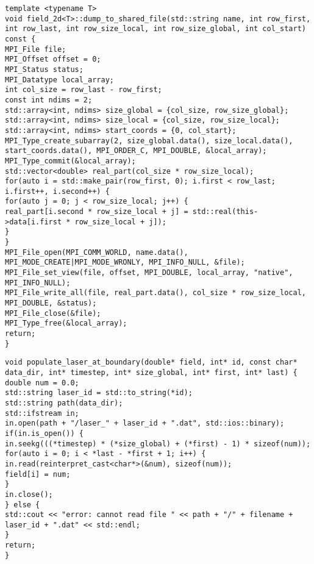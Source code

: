 \begin{lstlisting}[style=CXX, caption=Method for dumping data into shared file]
template <typename T>
void field_2d<T>::dump_to_shared_file(std::string name, int row_first, int row_last, int row_size_local, int row_size_global, int col_start) const {
MPI_File file;
MPI_Offset offset = 0;
MPI_Status status;
MPI_Datatype local_array;
int col_size = row_last - row_first;
const int ndims = 2;
std::array<int, ndims> size_global = {col_size, row_size_global};
std::array<int, ndims> size_local = {col_size, row_size_local};
std::array<int, ndims> start_coords = {0, col_start};
MPI_Type_create_subarray(2, size_global.data(), size_local.data(), start_coords.data(), MPI_ORDER_C, MPI_DOUBLE, &local_array);
MPI_Type_commit(&local_array);
std::vector<double> real_part(col_size * row_size_local);
for(auto i = std::make_pair(row_first, 0); i.first < row_last; i.first++, i.second++) {
for(auto j = 0; j < row_size_local; j++) {
real_part[i.second * row_size_local + j] = std::real(this->data[i.first * row_size_local + j]);
}
}
MPI_File_open(MPI_COMM_WORLD, name.data(), MPI_MODE_CREATE|MPI_MODE_WRONLY, MPI_INFO_NULL, &file);
MPI_File_set_view(file, offset, MPI_DOUBLE, local_array, "native", MPI_INFO_NULL);
MPI_File_write_all(file, real_part.data(), col_size * row_size_local, MPI_DOUBLE, &status);
MPI_File_close(&file);
MPI_Type_free(&local_array);
return;
}
\end{lstlisting}

\begin{lstlisting}[style=CXX, caption=Extern C++ function to fill Fortran arrays with laser fields dumped in binary file]
void populate_laser_at_boundary(double* field, int* id, const char* data_dir, int* timestep, int* size_global, int* first, int* last) {
double num = 0.0;
std::string laser_id = std::to_string(*id);
std::string path(data_dir);
std::ifstream in;
in.open(path + "/laser_" + laser_id + ".dat", std::ios::binary);
if(in.is_open()) {
in.seekg(((*timestep) * (*size_global) + (*first) - 1) * sizeof(num));
for(auto i = 0; i < *last - *first + 1; i++) {
in.read(reinterpret_cast<char*>(&num), sizeof(num));
field[i] = num;
}
in.close();
} else {
std::cout << "error: cannot read file " << path + "/" + filename + laser_id + ".dat" << std::endl;
}
return;
}
\end{lstlisting}

